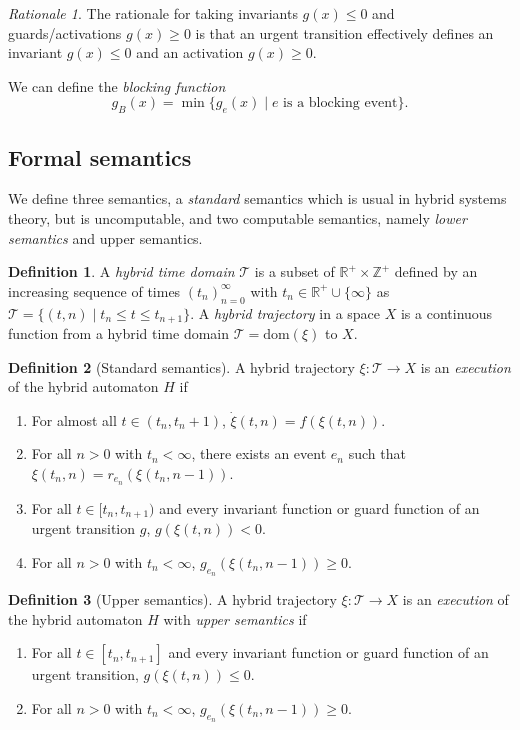 \documentclass[english,a4paper]{article}
\newcommand{\Z}{\mathbb{Z}}
\newcommand{\R}{\mathbb{R}}
\theoremstyle{theorem}
\theoremstyle{definition}
\newtheorem*{definition*}{Definition}
\theoremstyle{remark}
\newtheorem*{rationale*}{Rationale}
\begin{document}
\begin{rationale*}
The rationale for taking invariants $g(x)\leq 0$ and guards/activations $g(x)\geq0$ is that an urgent transition effectively defines an invariant $g(x)\leq0$ and an activation $g(x)\geq0$.
\end{rationale*}

We can define the \emph{blocking function}
$$g_B(x) = \min\{g_e(x) \mid e \text{ is a blocking event} \} .$$


\subsection*{Formal semantics}

We define three semantics, a \emph{standard} semantics which is usual in hybrid systems theory, but is uncomputable, and two computable semantics, namely \emph{lower semantics} and upper semantics.

\begin{definition*}
A \emph{hybrid time domain} $\mathcal{T}$ is a subset of $\R^+\times\Z^+$ defined by an increasing sequence of times $(t_n)_{n=0}^{\infty}$ with $t_n\in \R^+\cup\{\infty\}$ as
$\mathcal{T} = \{(t,n) \mid t_n\leq t\leq t_{n+1} \}$. A \emph{hybrid trajectory} in a space $X$ is a continuous function from a hybrid time domain $\mathcal{T}=\mathrm{dom}(\xi)$ to $X$.
\end{definition*}

\begin{definition*}[Standard semantics]
A hybrid trajectory $\xi:\mathcal{T}\rightarrow X$ is an \emph{execution} of the hybrid automaton $H$ if
\begin{enumerate}
\item For almost all $t\in (t_n,t_n+1)$, $\dot{\xi}(t,n) = f(\xi(t,n))$.
\item For all $n>0$ with $t_n<\infty$, there exists an event $e_n$ such that $\xi(t_n,n)=r_{e_n}(\xi(t_n,n\!-\!1))$.
\item For all $t\in[t_n,t_{n+1})$ and every invariant function or guard function of an urgent transition $g$, $g(\xi(t,n)) < 0$.
\item For all $n>0$ with $t_n<\infty$, $g_{e_n}(\xi(t_n,n\!-\!1))\geq0$.
\end{enumerate}
\end{definition*}

\begin{definition*}[Upper semantics]
A hybrid trajectory $\xi:\mathcal{T}\rightarrow X$ is an \emph{execution} of the hybrid automaton $H$ with \emph{upper semantics} if
\begin{enumerate}\addtocounter{enumi}{2}
\item For all $t\in[t_n,t_{n+1}]$ and every invariant function or guard function of an urgent transition, $g(\xi(t,n)) \leq 0$.
\item For all $n>0$ with $t_n<\infty$, $g_{e_n}(\xi(t_n,n\!-\!1))\geq0$.
\end{enumerate}
\end{definition*}
\end{document}
